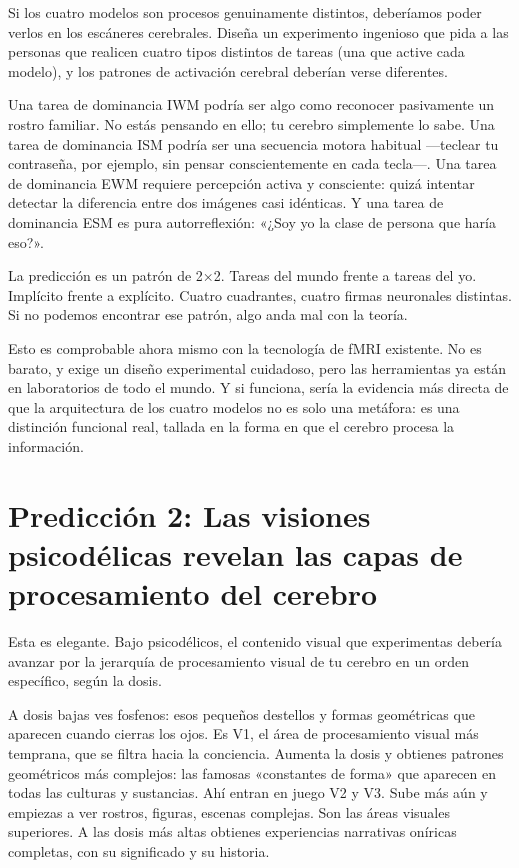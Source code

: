 \documentclass[11pt, twoside, openright]{book}
\begin{document}
Si los cuatro modelos son procesos genuinamente distintos, deberíamos poder verlos en los escáneres cerebrales. Diseña un experimento ingenioso que pida a las personas que realicen cuatro tipos distintos de tareas (una que active cada modelo), y los patrones de activación cerebral deberían verse diferentes.

Una tarea de dominancia IWM podría ser algo como reconocer pasivamente un rostro familiar. No estás pensando en ello; tu cerebro simplemente lo sabe. Una tarea de dominancia ISM podría ser una secuencia motora habitual ---teclear tu contraseña, por ejemplo, sin pensar conscientemente en cada tecla---. Una tarea de dominancia EWM requiere percepción activa y consciente: quizá intentar detectar la diferencia entre dos imágenes casi idénticas. Y una tarea de dominancia ESM es pura autorreflexión: «¿Soy yo la clase de persona que haría eso?».

La predicción es un patrón de 2×2. Tareas del mundo frente a tareas del yo. Implícito frente a explícito. Cuatro cuadrantes, cuatro firmas neuronales distintas. Si no podemos encontrar ese patrón, algo anda mal con la teoría.

Esto es comprobable ahora mismo con la tecnología de fMRI existente. No es barato, y exige un diseño experimental cuidadoso, pero las herramientas ya están en laboratorios de todo el mundo. Y si funciona, sería la evidencia más directa de que la arquitectura de los cuatro modelos no es solo una metáfora: es una distinción funcional real, tallada en la forma en que el cerebro procesa la información.

\section*{Predicción 2: Las visiones psicodélicas revelan las capas de procesamiento del cerebro}

Esta es elegante. Bajo psicodélicos, el contenido visual que experimentas debería avanzar por la jerarquía de procesamiento visual de tu cerebro en un orden específico, según la dosis.

A dosis bajas ves fosfenos: esos pequeños destellos y formas geométricas que aparecen cuando cierras los ojos. Es V1, el área de procesamiento visual más temprana, que se filtra hacia la conciencia. Aumenta la dosis y obtienes patrones geométricos más complejos: las famosas «constantes de forma» que aparecen en todas las culturas y sustancias. Ahí entran en juego V2 y V3. Sube más aún y empiezas a ver rostros, figuras, escenas complejas. Son las áreas visuales superiores. A las dosis más altas obtienes experiencias narrativas oníricas completas, con su significado y su historia.
\end{document}
